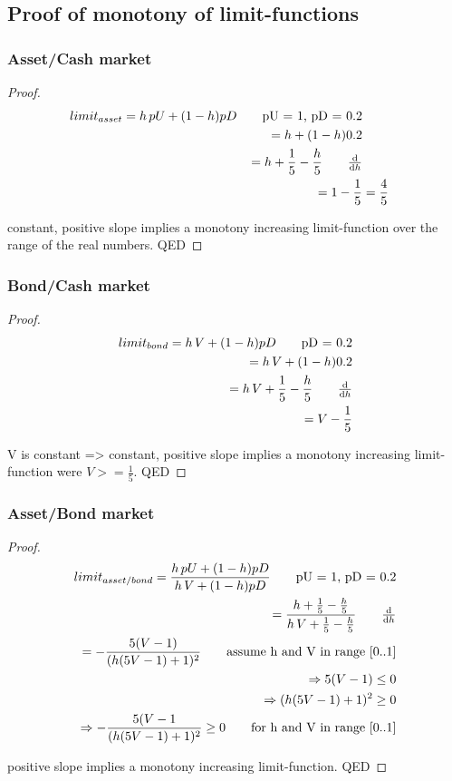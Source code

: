 \documentclass[Bachelorarbeit.tex]{subfiles}
\begin{document}
\subsection{Proof of monotony of limit-functions}
\subsubsection{Asset/Cash market}
\begin{proof}
\begin{align*}
	limit_{asset} = h \, pU + (1-h) pD		\tag*{pU = 1, pD = 0.2}
	\\ = h + (1 - h)0.2
	\\ = h + \frac{1}{5} - \frac{h}{5}		\tag*{$\frac{\mathrm d}{\mathrm d h}$}
	\\ = 1 - \frac{1}{5}
		&= \frac{4}{5}
\end{align*}

constant, positive slope implies a monotony increasing limit-function over the range of the real numbers. QED
\end{proof}

\subsubsection{Bond/Cash market}
\begin{proof}
\begin{align*}
	limit_{bond} = h \, V + (1-h) pD			\tag*{pD = 0.2}
	\\ = h \, V + (1 - h)0.2
	\\ = h \, V + \frac{1}{5} - \frac{h}{5}		\tag*{$\frac{\mathrm d}{\mathrm d h}$}
	\\ = V - \frac{1}{5}
\end{align*}

V is constant => constant, positive slope implies a monotony increasing limit-function were $V >= \frac{1}{5}$. QED
\end{proof}

\subsubsection{Asset/Bond market}
\begin{proof}
\begin{align*}
	limit_{asset/bond} = \frac{h \, pU + (1-h) pD}{h \, V + (1-h) pD} 				\tag*{pU = 1, pD = 0.2}
	\\ = \frac{h + \frac{1}{5} - \frac{h}{5}}{h \, V + \frac{1}{5} - \frac{h}{5}}	\tag*{$\frac{\mathrm d}{\mathrm d h}$}
	\\ = - \frac{5(V-1)}{(h(5V-1)+1)^2}									\tag*{assume h and V in range [0..1]}
	\\ \Rightarrow 5(V-1) \leq 0
	\\ \Rightarrow (h(5V-1)+1)^2 \geq 0
	\\ \Rightarrow - \frac{5(V-1}{(h(5V-1)+1)^2} \geq 0 			\tag*{for h and V in range [0..1]}
\end{align*}

positive slope implies a monotony increasing limit-function. QED

\end{proof}
\end{document}
